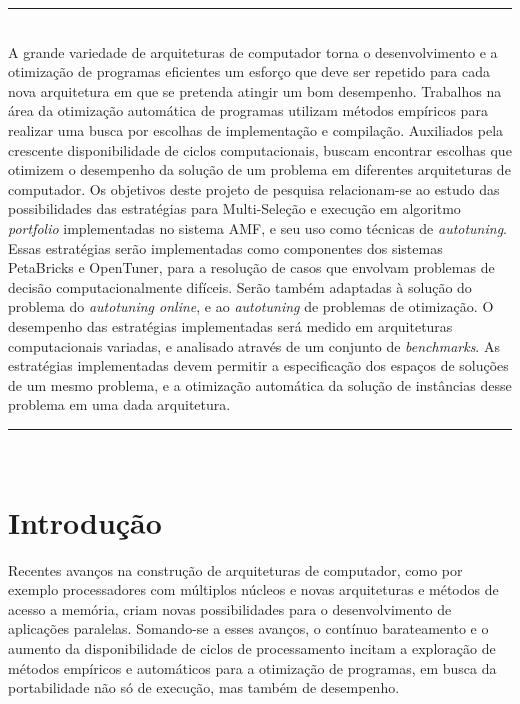 \documentclass[a4paper, 11pt]{article}
\begin{document}
\abstract
\noindent
\rule{\linewidth}{.1mm} \\
\noindent
A grande variedade de arquiteturas de computador torna o desenvolvimento e a 
otimização de programas eficientes um esforço que deve ser repetido para cada 
nova arquitetura em que se pretenda atingir um bom desempenho.
Trabalhos na área da otimização automática de programas utilizam métodos 
empíricos para realizar uma busca por escolhas de implementação e compilação.
Auxiliados pela crescente disponibilidade de ciclos computacionais,
buscam encontrar escolhas que otimizem o desempenho da solução de um problema
em diferentes arquiteturas de computador. Os objetivos deste projeto de 
pesquisa relacionam-se ao estudo das possibilidades das estratégias para 
Multi-Seleção e execução em algoritmo \emph{portfolio} implementadas no sistema
AMF, e seu uso como técnicas de \emph{autotuning}.
Essas estratégias serão implementadas como componentes dos sistemas PetaBricks
e OpenTuner, para a resolução de casos que envolvam problemas de decisão 
computacionalmente difíceis. 
Serão também adaptadas à solução do problema do \emph{autotuning online}, e ao 
\emph{autotuning} de problemas de otimização.
O desempenho das estratégias implementadas será medido em arquiteturas 
computacionais variadas, e analisado através de um conjunto de 
\emph{benchmarks}. As estratégias implementadas devem permitir a especificação
dos espaços de soluções de um mesmo problema, e a otimização automática da 
solução de instâncias desse problema em uma dada arquitetura.

\noindent
\rule{\linewidth}{.1mm} \\

\tableofcontents

\newpage

\section{Introdução}

Recentes avanços na construção de arquiteturas de computador, como
por exemplo processadores com múltiplos núcleos e novas arquiteturas
e métodos de acesso a memória, criam novas possibilidades para o 
desenvolvimento de aplicações paralelas. Somando-se a esses avanços, o contínuo
barateamento e o aumento da disponibilidade de ciclos de processamento incitam 
a exploração de métodos empíricos e automáticos para a otimização de programas,
em busca da portabilidade não só de execução, mas também de desempenho. 
\end{document}
